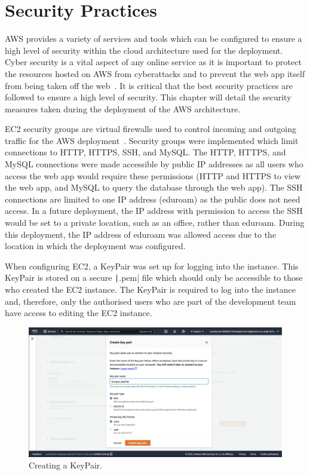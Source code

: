 \chapter{Security Practices}\label{ch:security-practices}
AWS provides a variety of services and tools which can be configured to ensure a high level of security within the
cloud architecture used for the deployment.
Cyber security is a vital aspect of any online service as it is important to protect the resources hosted on AWS from
cyberattacks and to prevent the web app itself from being taken off the web~\parencite{cavelty2010cyber}.
It is critical that the best security practices are followed to ensure a high level of security.
This chapter will detail the security measures taken during the deployment of the AWS architecture.

EC2 security groups are virtual firewalls used to control incoming and outgoing traffic for the AWS
deployment~\parencite{amazon2022amazon2}.
Security groups were implemented which limit connections to HTTP, HTTPS, SSH, and MySQL\@.
The HTTP, HTTPS, and MySQL connections were made accessible by public IP addresses as all users who access the web app
would require these permissions (HTTP and HTTPS to view the web app, and MySQL to query the database through the web
app).
The SSH connections are limited to one IP address (eduroam) as the public does not need access.
In a future deployment, the IP address with permission to access the SSH would be set to a private location, such as an
office, rather than eduroam.
During this deployment, the IP address of eduroam was allowed access due to the location in which the deployment was
configured.


When configuring EC2, a KeyPair was set up for logging into the instance.
This KeyPair is stored on a secure \texttt|.pem| file which should only be accessible to those who created
the EC2 instance.
The KeyPair is required to log into the instance and, therefore, only the authorised users who are part of the
development team have access to editing the EC2 instance.

\begin{figure}[!htbp]
    \centering
    \includegraphics[width=\textwidth]{resources/ec2/create-key-pair}
    \caption{Creating a KeyPair.}
    \label{fig:create-keypair-pem}
\end{figure}

